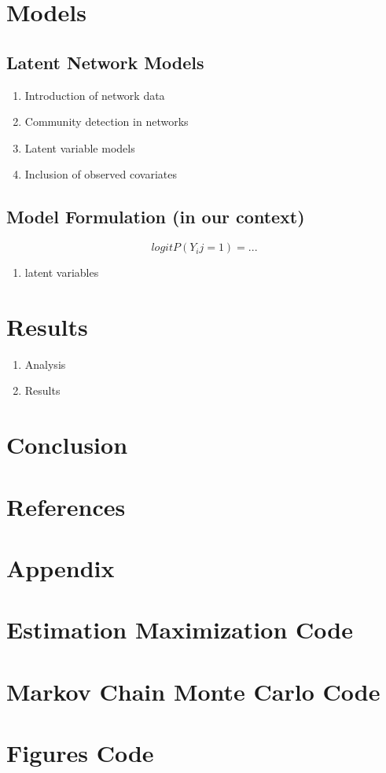 \documentclass{article}
\begin{document}
\section{Models}
\subsection{Latent Network Models}
\begin{enumerate}
    \item Introduction of network data
    \item Community detection in networks
    \item Latent variable models 
    \item Inclusion of observed covariates
\end{enumerate}

\subsection{Model Formulation (in our context)}
$$logit P(Y_ij = 1) = ... $$
\begin{enumerate}
	\item latent variables 
\end{enumerate}

\section{Results}
\begin{enumerate}
    \item Analysis
    \item Results
\end{enumerate}


\section{Conclusion}
\section{References}
\printbibliography

\section*{Appendix}
\appendix 

\section{Estimation Maximization Code}
\section{Markov Chain Monte Carlo Code}
\section{Figures Code}
\end{document}
